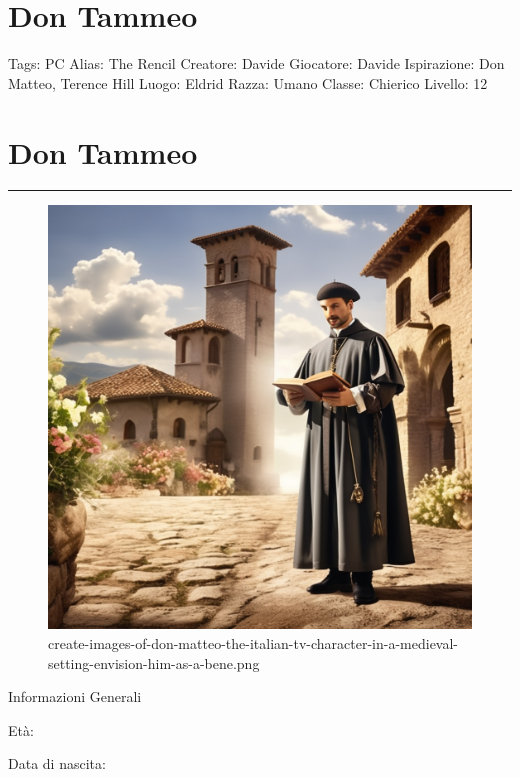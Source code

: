 \section{Don Tammeo}\label{don-tammeo}

Tags: PC Alias: The Rencil Creatore: Davide Giocatore: Davide
Ispirazione: Don Matteo, Terence Hill Luogo: Eldrid Razza: Umano Classe:
Chierico Livello: 12

\section{Don Tammeo}\label{don-tammeo-1}

\begin{center}\rule{0.5\linewidth}{0.5pt}\end{center}

\begin{figure}
\centering
\includegraphics{create-images-of-don-matteo-the-italian-tv-character-in-a-medieval-setting-envision-him-as-a-bene.png}
\caption{create-images-of-don-matteo-the-italian-tv-character-in-a-medieval-setting-envision-him-as-a-bene.png}
\end{figure}

Informazioni Generali

Età:

Data di nascita:

